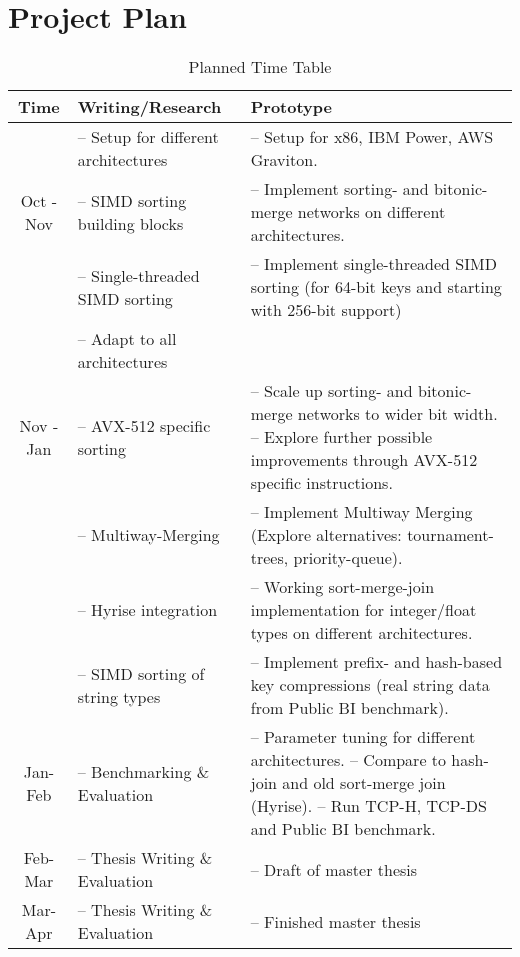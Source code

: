 \section{Project Plan}
\label{sec:plan}

\begin{longtable}{ | c | m{} | m{} | }
   \caption{Planned Time Table} \label{tab:time-table} \\
    \hline
    \textbf{Time} & \textbf{Writing/Research} & \textbf{Prototype} \\
    \hline
               & -- Setup for different architectures &  -- Setup for x86, IBM Power, AWS Graviton. \\
    Oct - Nov  & -- SIMD sorting building blocks & -- Implement sorting- and bitonic-merge networks on different architectures.\\ 
               & -- Single-threaded SIMD sorting & -- Implement single-threaded SIMD sorting (for 64-bit keys and starting with 256-bit support) \\ 
               & -- Adapt to all architectures \\
    \hline
    Nov - Jan & -- AVX-512 specific sorting & -- Scale up sorting- and bitonic-merge networks to wider bit width. \newline -- Explore further possible improvements through AVX-512 specific instructions. \\
              & -- Multiway-Merging & -- Implement Multiway Merging (Explore alternatives: tournament-trees, priority-queue). \\    
              & -- Hyrise integration & -- Working sort-merge-join implementation for integer/float types on different architectures.\\ 
              & -- SIMD sorting of string types & -- Implement prefix- and hash-based key compressions (real string data from Public BI benchmark).\\ 
    \hline
    Jan-Feb & -- Benchmarking \& Evaluation & -- Parameter tuning for different architectures. \newline 
                                               -- Compare to hash-join and old sort-merge join (Hyrise). \newline
                                               -- Run TCP-H, TCP-DS and Public BI benchmark. \\
    \hline
    Feb-Mar & -- Thesis Writing \& Evaluation & -- Draft of master thesis\\
    \hline
    Mar-Apr & -- Thesis Writing \& Evaluation & -- Finished master thesis \\
   \hline 
\end{longtable}


